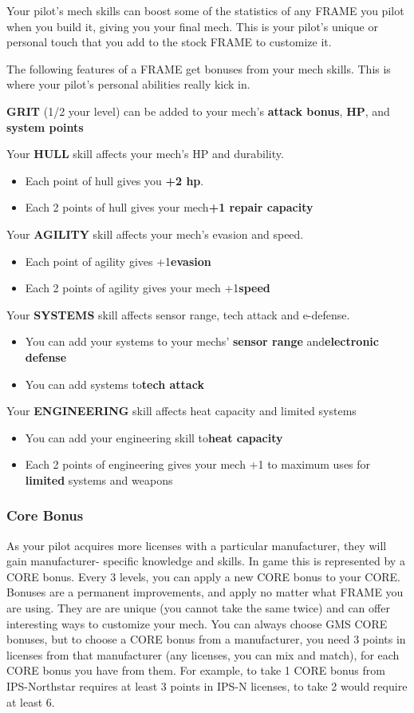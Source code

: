 Your pilot’s mech skills can boost some of the statistics of any FRAME you pilot when you build it, giving you your final mech. This is your pilot’s unique or personal touch that you add to the stock FRAME to customize it. 

The following features of a FRAME get bonuses from your mech skills. This is where your pilot’s personal abilities really kick in. 

\textbf{GRIT} (1/2 your level) can be added to your mech’s \textbf{attack bonus}, \textbf{HP}, and \textbf{system points} 


Your \textbf{HULL} skill affects your mech’s HP and durability.
\begin{itemize}
\item Each point of hull gives you \textbf{+2 hp}.
\item Each 2 points of hull gives your mech\textbf{+1 repair capacity} 
\end{itemize}
Your \textbf{AGILITY} skill affects your mech’s evasion and speed.
\begin{itemize}
\item Each point of agility gives +1\textbf{evasion} 
\item Each 2 points of agility gives your mech +1\textbf{speed} 
\end{itemize}
Your \textbf{SYSTEMS} skill affects sensor range, tech attack and e-defense.
\begin{itemize}
\item You can add your systems to your mechs’ \textbf{sensor range} and\textbf{electronic defense} 
\item You can add systems to\textbf{tech attack} 
\end{itemize}
Your \textbf{ENGINEERING} skill affects heat capacity and limited systems
\begin{itemize}
\item You can add your engineering skill to\textbf{heat capacity} 
\item Each 2 points of engineering gives your mech +1 to maximum uses for \textbf{limited} systems and weapons
\end{itemize}
       
\subsubsection{Core Bonus}

As your pilot acquires more licenses with a particular manufacturer, they will gain manufacturer- specific knowledge and skills. In game this is represented by a CORE bonus. Every 3 levels, you can apply a new CORE bonus to your CORE. Bonuses are a permanent improvements, and apply no matter what FRAME you are using. They are are unique (you cannot take the same twice) and can offer interesting ways to customize your mech. You can always choose GMS CORE bonuses, but to choose a CORE bonus from a manufacturer, you need 3 points in licenses from that manufacturer (any licenses, you can mix and match), for each CORE bonus you have from them. For example, to take 1 CORE bonus from IPS-Northstar requires at least 3 points in IPS-N licenses, to take 2 would require at least 6.

